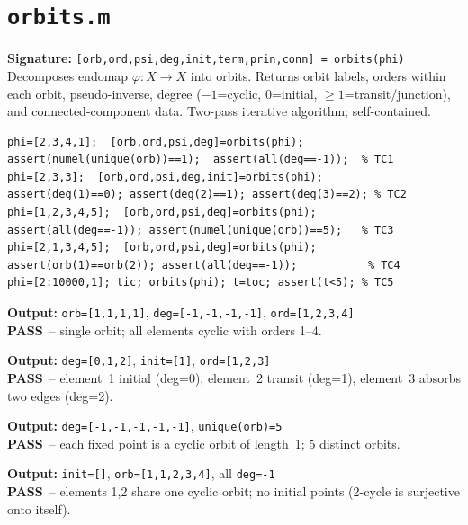 \documentclass[12pt,a4paper]{report}
\newcommand{\mf}[1]{\texttt{#1}}
\newcommand{\PASS}{\textcolor{green!60!black}{\textbf{PASS}}}
\begin{document}
\chapter{\mf{orbits.m}}
\begin{tcolorbox}[Abox,title=Analysis]
\textbf{Signature:} \lstinline|[orb,ord,psi,deg,init,term,prin,conn] = orbits(phi)|\\
Decomposes endomap $\varphi:X\!\to\!X$ into orbits. Returns orbit labels, orders within each orbit, pseudo-inverse, degree ($-1$=cyclic, $0$=initial, $\geq1$=transit/junction), and connected-component data. Two-pass iterative algorithm; self-contained.
\end{tcolorbox}
\begin{lstlisting}[caption={Tests for orbits.m}]
phi=[2,3,4,1];  [orb,ord,psi,deg]=orbits(phi);
assert(numel(unique(orb))==1);  assert(all(deg==-1));  % TC1
phi=[2,3,3];  [orb,ord,psi,deg,init]=orbits(phi);
assert(deg(1)==0); assert(deg(2)==1); assert(deg(3)==2); % TC2
phi=[1,2,3,4,5];  [orb,ord,psi,deg]=orbits(phi);
assert(all(deg==-1)); assert(numel(unique(orb))==5);   % TC3
phi=[2,1,3,4,5];  [orb,ord,psi,deg]=orbits(phi);
assert(orb(1)==orb(2)); assert(all(deg==-1));           % TC4
phi=[2:10000,1]; tic; orbits(phi); t=toc; assert(t<5); % TC5
\end{lstlisting}
\begin{tcolorbox}[Pbox,title=TC1 -- Pure 4-cycle \texttt{[2,3,4,1]}]
\textbf{Output:} \texttt{orb=[1,1,1,1]}, \texttt{deg=[-1,-1,-1,-1]}, \texttt{ord=[1,2,3,4]}\\
\PASS\ -- single orbit; all elements cyclic with orders 1--4.
\end{tcolorbox}
\begin{tcolorbox}[Pbox,title=TC2 -- Chain \texttt{[2,3,3]}]
\textbf{Output:} \texttt{deg=[0,1,2]}, \texttt{init=[1]}, \texttt{ord=[1,2,3]}\\
\PASS\ -- element~1 initial (deg=0), element~2 transit (deg=1), element~3 absorbs two edges (deg=2).
\end{tcolorbox}
\begin{tcolorbox}[Pbox,title=TC3 -- Identity \texttt{[1,2,3,4,5]}]
\textbf{Output:} \texttt{deg=[-1,-1,-1,-1,-1]}, \texttt{unique(orb)=5}\\
\PASS\ -- each fixed point is a cyclic orbit of length~1; 5 distinct orbits.
\end{tcolorbox}
\begin{tcolorbox}[Pbox,title=TC4 -- 2-cycle + fixed points \texttt{[2,1,3,4,5]}]
\textbf{Output:} \texttt{init=[]}, \texttt{orb=[1,1,2,3,4]}, all \texttt{deg=-1}\\
\PASS\ -- elements 1,2 share one cyclic orbit; no initial points (2-cycle is surjective onto itself).
\end{tcolorbox}
\end{document}
